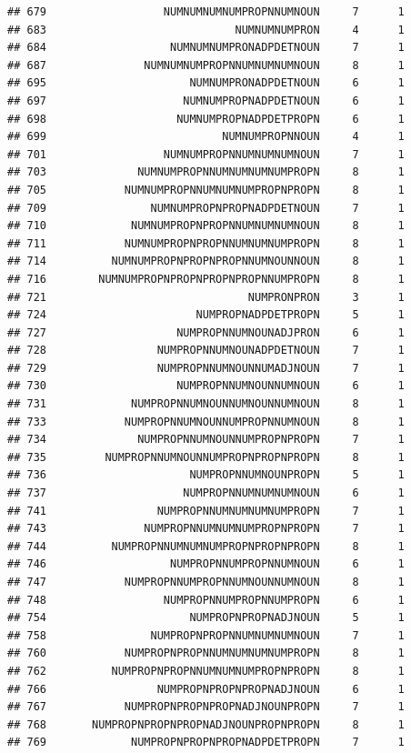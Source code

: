 \documentclass[]{article}
\begin{document}
\begin{verbatim}
## 679                  NUMNUMNUMNUMPROPNNUMNOUN     7      1
## 683                             NUMNUMNUMPRON     4      1
## 684                   NUMNUMNUMPRONADPDETNOUN     7      1
## 687               NUMNUMNUMPROPNNUMNUMNUMNOUN     8      1
## 695                      NUMNUMPRONADPDETNOUN     6      1
## 697                     NUMNUMPROPNADPDETNOUN     6      1
## 698                    NUMNUMPROPNADPDETPROPN     6      1
## 699                           NUMNUMPROPNNOUN     4      1
## 701                  NUMNUMPROPNNUMNUMNUMNOUN     7      1
## 703              NUMNUMPROPNNUMNUMNUMNUMPROPN     8      1
## 705            NUMNUMPROPNNUMNUMNUMPROPNPROPN     8      1
## 709                NUMNUMPROPNPROPNADPDETNOUN     7      1
## 710             NUMNUMPROPNPROPNNUMNUMNUMNOUN     8      1
## 711            NUMNUMPROPNPROPNNUMNUMNUMPROPN     8      1
## 714          NUMNUMPROPNPROPNPROPNNUMNOUNNOUN     8      1
## 716        NUMNUMPROPNPROPNPROPNPROPNNUMPROPN     8      1
## 721                               NUMPRONPRON     3      1
## 724                       NUMPROPNADPDETPROPN     5      1
## 727                    NUMPROPNNUMNOUNADJPRON     6      1
## 728                 NUMPROPNNUMNOUNADPDETNOUN     7      1
## 729                 NUMPROPNNUMNOUNNUMADJNOUN     7      1
## 730                    NUMPROPNNUMNOUNNUMNOUN     6      1
## 731             NUMPROPNNUMNOUNNUMNOUNNUMNOUN     8      1
## 733            NUMPROPNNUMNOUNNUMPROPNNUMNOUN     8      1
## 734              NUMPROPNNUMNOUNNUMPROPNPROPN     7      1
## 735         NUMPROPNNUMNOUNNUMPROPNPROPNPROPN     8      1
## 736                      NUMPROPNNUMNOUNPROPN     5      1
## 737                     NUMPROPNNUMNUMNUMNOUN     6      1
## 741                 NUMPROPNNUMNUMNUMNUMPROPN     7      1
## 743               NUMPROPNNUMNUMNUMPROPNPROPN     7      1
## 744          NUMPROPNNUMNUMNUMPROPNPROPNPROPN     8      1
## 746                   NUMPROPNNUMPROPNNUMNOUN     6      1
## 747            NUMPROPNNUMPROPNNUMNOUNNUMNOUN     8      1
## 748                  NUMPROPNNUMPROPNNUMPROPN     6      1
## 754                      NUMPROPNPROPNADJNOUN     5      1
## 758                NUMPROPNPROPNNUMNUMNUMNOUN     7      1
## 760            NUMPROPNPROPNNUMNUMNUMNUMPROPN     8      1
## 762          NUMPROPNPROPNNUMNUMNUMPROPNPROPN     8      1
## 766                 NUMPROPNPROPNPROPNADJNOUN     6      1
## 767            NUMPROPNPROPNPROPNADJNOUNPROPN     7      1
## 768       NUMPROPNPROPNPROPNADJNOUNPROPNPROPN     8      1
## 769             NUMPROPNPROPNPROPNADPDETPROPN     7      1

\end{verbatim}
\end{document}
